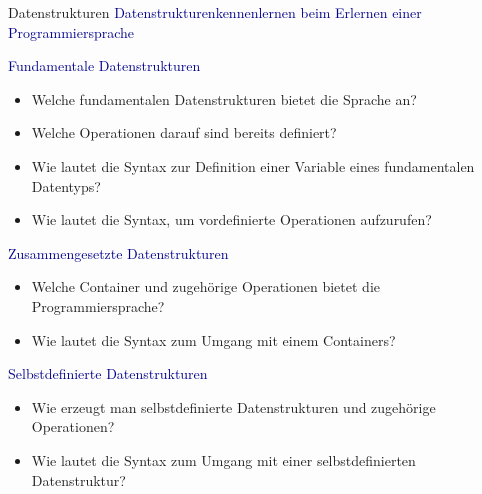 \documentclass[
  8pt,
  ignorenonframetext,
]{beamer}
\providecommand{\tightlist}{%
  \setlength{\itemsep}{0pt}\setlength{\parskip}{0pt}}
\begin{document}
\begin{frame}{Datenstrukturen}
\protect\hypertarget{datenstrukturen-1}{}
\textcolor{darkblue}{Datenstrukturenkennenlernen beim Erlernen einer Programmiersprache}

\small

\textcolor{darkblue}{Fundamentale Datenstrukturen}

\begin{itemize}
\tightlist
\item
  Welche fundamentalen Datenstrukturen bietet die Sprache an?
\item
  Welche Operationen darauf sind bereits definiert?
\item
  Wie lautet die Syntax zur Definition einer Variable eines
  fundamentalen Datentyps?
\item
  Wie lautet die Syntax, um vordefinierte Operationen aufzurufen?
\end{itemize}

\textcolor{darkblue}{Zusammengesetzte Datenstrukturen}

\begin{itemize}
\tightlist
\item
  Welche Container und zugehörige Operationen bietet die
  Programmiersprache?
\item
  Wie lautet die Syntax zum Umgang mit einem Containers?
\end{itemize}

\textcolor{darkblue}{Selbstdefinierte Datenstrukturen}

\begin{itemize}
\tightlist
\item
  Wie erzeugt man selbstdefinierte Datenstrukturen und zugehörige
  Operationen?
\item
  Wie lautet die Syntax zum Umgang mit einer selbstdefinierten
  Datenstruktur?
\end{itemize}
\end{frame}
\end{document}
